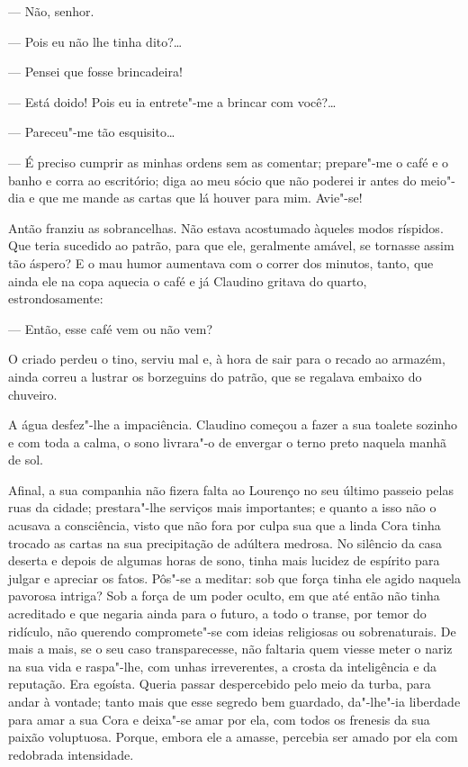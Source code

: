 --- Não, senhor.

--- Pois eu não lhe tinha dito?\ldots{}

--- Pensei que fosse brincadeira!

--- Está doido! Pois eu ia entrete"-me a brincar com você?\ldots{}

--- Pareceu"-me tão esquisito\ldots{}

--- É preciso cumprir as minhas ordens sem as comentar; prepare"-me o
café e o banho e corra ao escritório; diga ao meu sócio que não poderei
ir antes do meio"-dia e que me mande as cartas que lá houver para mim.
Avie"-se!

Antão franziu as sobrancelhas. Não estava acostumado àqueles modos
ríspidos. Que teria sucedido ao patrão, para que ele, geralmente amável,
se tornasse assim tão áspero? E o mau humor aumentava com o correr dos
minutos, tanto, que ainda ele na copa aquecia o café e já Claudino
gritava do quarto, estrondosamente:

--- Então, esse café vem ou não vem?

O criado perdeu o tino, serviu mal e, à hora de sair para o recado ao
armazém, ainda correu a lustrar os borzeguins do patrão, que se regalava
embaixo do chuveiro.

A água desfez"-lhe a impaciência. Claudino começou a fazer a sua toalete
sozinho e com toda a calma, o sono livrara"-o de envergar o terno preto
naquela manhã de sol.

Afinal, a sua companhia não fizera falta ao Lourenço no seu último
passeio pelas ruas da cidade; prestara"-lhe serviços mais importantes; e
quanto a isso não o acusava a consciência, visto que não fora por culpa
sua que a linda Cora tinha trocado as cartas na sua precipitação de
adúltera medrosa. No silêncio da casa deserta e depois de algumas horas
de sono, tinha mais lucidez de espírito para julgar e apreciar os fatos.
Pôs"-se a meditar: sob que força tinha ele agido naquela pavorosa
intriga? Sob a força de um poder oculto, em que até então não tinha
acreditado e que negaria ainda para o futuro, a todo o transe, por temor
do ridículo, não querendo compromete"-se com ideias religiosas ou
sobrenaturais. De mais a mais, se o seu caso transparecesse, não
faltaria quem viesse meter o nariz na sua vida e raspa"-lhe, com unhas
irreverentes, a crosta da inteligência e da reputação. Era egoísta.
Queria passar despercebido pelo meio da turba, para andar à vontade;
tanto mais que esse segredo bem guardado, da"-lhe"-ia liberdade para amar
a sua Cora e deixa"-se amar por ela, com todos os frenesis da sua paixão
voluptuosa. Porque, embora ele a amasse, percebia ser amado por ela com
redobrada intensidade.

